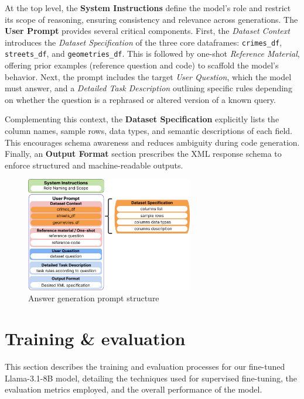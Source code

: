 At the top level, the \textbf{System Instructions} define the model’s role and restrict its scope of reasoning, ensuring consistency and relevance across generations. The \textbf{User Prompt} provides several critical components. First, the \textit{Dataset Context} introduces the \textit{Dataset Specification} of the three core dataframes: \texttt{crimes\_df}, \texttt{streets\_df}, and \texttt{geometries\_df}. This is followed by one-shot \textit{Reference Material}, offering prior examples (reference question and code) to scaffold the model’s behavior. Next, the prompt includes the target \textit{User Question}, which the model must answer, and a \textit{Detailed Task Description} outlining specific rules depending on whether the question is a rephrased or altered version of a known query.

Complementing this context, the \textbf{Dataset Specification} explicitly lists the column names, sample rows, data types, and semantic descriptions of each field. This encourages schema awareness and reduces ambiguity during code generation. Finally, an \textbf{Output Format} section prescribes the XML response schema to enforce structured and machine-readable outputs.

\begin{figure}[hbtp]
  \centering
  \includegraphics[width=0.65\textwidth]{images/answer_gen.png}
  \caption{Answer generation prompt structure}
  \label{fig:answer_generation_prompt_structure}
\end{figure}


\section{Training & evaluation}

This section describes the training and evaluation processes for our fine-tuned Llama-3.1-8B model, detailing the techniques used for supervised fine-tuning, the evaluation metrics employed, and the overall performance of the model.


